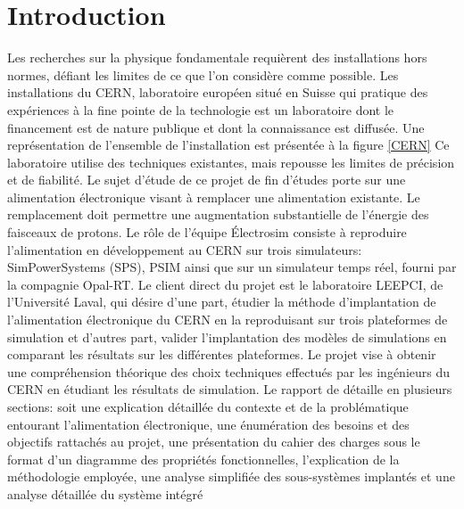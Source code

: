 \chapter{Introduction}
Les recherches sur la physique fondamentale requièrent des installations hors normes, défiant les limites de ce que l'on considère comme possible. Les installations du CERN, laboratoire européen situé en Suisse qui pratique des expériences à la fine pointe de la technologie est un laboratoire dont le financement est de nature publique et dont la connaissance est diffusée. Une représentation de l'ensemble de l'installation est présentée à la figure \ref{CERN} Ce laboratoire utilise des techniques existantes, mais repousse les limites de précision et de fiabilité. Le sujet d'étude de ce projet de fin d'études porte sur une alimentation électronique visant à remplacer une alimentation existante. Le remplacement doit permettre une augmentation substantielle de l'énergie des faisceaux de protons. Le rôle de l'équipe Électrosim consiste à reproduire l'alimentation en développement au CERN sur  trois simulateurs: SimPowerSystems (SPS), PSIM ainsi que sur un simulateur temps réel, fourni par la compagnie Opal-RT. Le client direct du projet est le laboratoire LEEPCI, de l'Université Laval, qui désire d'une part, étudier la méthode d'implantation de l'alimentation électronique du CERN en la reproduisant sur trois plateformes de simulation et d'autres part, valider l'implantation des modèles de simulations en comparant les résultats sur les différentes plateformes. Le projet vise à obtenir une compréhension théorique des choix techniques effectués par les ingénieurs du CERN en étudiant les résultats de simulation. Le rapport de détaille en plusieurs sections: soit une explication détaillée du contexte et de la problématique entourant l'alimentation électronique, une énumération des besoins et des objectifs rattachés au projet, une présentation du cahier des charges sous le format d'un diagramme des propriétés fonctionnelles,   l'explication de la méthodologie employée, une analyse simplifiée des sous-systèmes implantés et une analyse détaillée du système intégré

